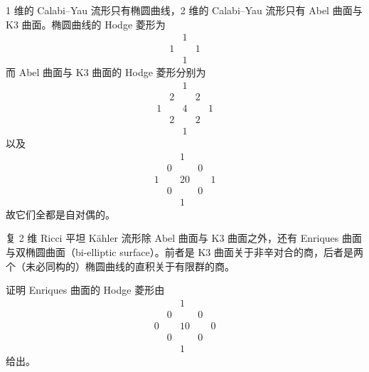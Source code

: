 1 维的 Calabi--Yau 流形只有椭圆曲线，2 维的 Calabi--Yau 流形只有 Abel 曲面与 K3 曲面。椭圆曲线的 Hodge 菱形为
\begin{equation}
  \begin{array}{ccccc}
    & & 1 & & \\
    & 1 & & 1 & \\
    & & 1 & &
  \end{array}
  \tag{9.5}
\end{equation}
而 Abel 曲面与 K3 曲面的 Hodge 菱形分别为
\begin{equation}
  \begin{array}{ccccc}
    & & 1 & & \\
    & 2 & & 2 & \\
    1 & & 4 & & 1\\
    & 2 & & 2 & \\
    & & 1 & &
  \end{array}
  \tag{9.6}
\end{equation}
以及
\begin{equation}
  \begin{array}{ccccc}
    & & 1 & & \\
    & 0 & & 0 & \\
    1 & & 20 & & 1\\
    & 0 & & 0 & \\
    & & 1 & &
  \end{array}
  \tag{9.7}
\end{equation}
故它们全都是自对偶的。

\begin{remark}
复 2 维 Ricci 平坦 Kähler 流形除 Abel 曲面与 K3 曲面之外，还有 Enriques 曲面与双椭圆曲面（bi-elliptic surface）。前者是 K3 曲面关于非辛对合的商，后者是两个（未必同构的）椭圆曲线的直积关于有限群的商。
\end{remark}

\begin{exercise}
证明 Enriques 曲面的 Hodge 菱形由
\begin{equation}
  \begin{array}{ccccc}
    & & 1 & & \\
    & 0 & & 0 & \\
    0 & & 10 & & 0\\
    & 0 & & 0 & \\
    & & 1 & &
  \end{array}
  \tag{9.8}
\end{equation}
给出。
\end{exercise}

